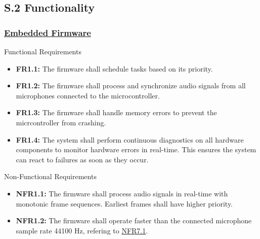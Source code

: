 \documentclass[12pt]{article}
\theoremstyle{definition}
\begin{document}
\subsection{S.2 Functionality}

\subsubsection{\hyperref[comp:embedded_firmware]{Embedded Firmware}}
Functional Requirements
\begin{itemize}
  \item \label{FR1_1}\textbf{FR1.1:} The firmware shall schedule tasks
  based on its priority.
  
  \item \label{FR1_2}\textbf{FR1.2:} The firmware shall process and
  synchronize audio signals from all microphones connected to the
  microcontroller.

  \item \label{FR1_3}\textbf{FR1.3:} The firmware shall handle memory errors to
  prevent the micrcontroller from crashing.

  \item \label{FR1_4}\textbf{FR1.4:} The system shall perform continuous
  diagnostics on all hardware components to monitor hardware errors in
  real-time. This ensures the system can react to failures as soon as they 
  occur.
\end{itemize}

Non-Functional Requirements
\begin{itemize}
  \item \label{NFR1_1}\textbf{NFR1.1:} The firmware shall process audio
  signals in real-time with monotonic frame sequences. Earliest frames shall
  have higher priority.
  
  \item \label{NFR1_2}\textbf{NFR1.2:} The firmware shall operate
  faster than the connected microphone sample rate 44100 Hz, refering to
  \hyperref[NFR7_1]{NFR7.1}.
\end{itemize}
\end{document}
